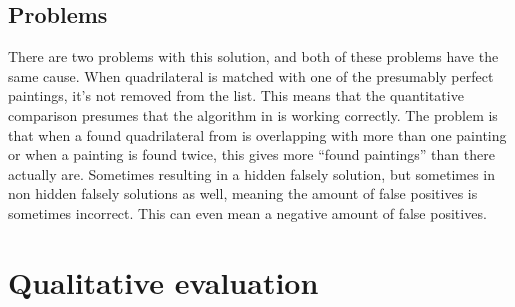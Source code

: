 \subsection{Problems}
There are two problems with this solution, and both of these problems have the same cause. When quadrilateral is matched with one of the presumably perfect paintings, it's not removed from the list. This means that the quantitative comparison presumes that the algorithm in  is working correctly. The problem is that when a found quadrilateral from  is overlapping with more than one painting or when a painting is found twice, this gives more ``found paintings'' than there actually are. Sometimes resulting in a hidden falsely solution, but sometimes in non hidden falsely solutions as well, meaning the amount of false positives is sometimes incorrect. This can even mean a negative amount of false positives.



\section{Qualitative evaluation}


